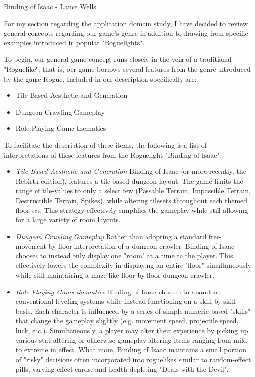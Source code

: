 \documentclass[12pt]{report}
\begin{document}
\begin{section}{Binding of Isaac - Lance Wells}

For my section regarding the application domain study, I have decided to review general concepts 
regarding our game's genre in addition to drawing from specific examples introduced in popular 
"Roguelights".

To begin, our general game concept runs closely in the vein of a traditional "Roguelike"; that is, 
our game borrows several features from the genre introduced by the game Rogue. Included in our 
description specifically are:

\begin{itemize}
\item Tile-Based Aesthetic and Generation
\item Dungeon Crawling Gameplay
\item Role-Playing Game thematics
\end{itemize}
To facilitate the description of these items, the following is a list of interpretations of these 
features from the Roguelight "Binding of Isaac".
\begin{itemize}
\item \emph{Tile-Based Aesthetic and Generation}\newline
Binding of Isaac (or more recently, the Rebirth edition), features a tile-based dungeon layout. 
The game limits the range of tile-values to only a select few (Passable Terrain, Impassible Terrain, 
Destructible Terrain, Spikes), while altering tilesets throughout each themed floor set. This strategy 
effectively simplifies the gameplay while still allowing for a large variety of room layouts.
\item	\emph{Dungeon Crawling Gameplay}\newline
Rather than adopting a standard free-movement-by-floor interpretation of a dungeon crawler. Binding 
of Isaac chooses to instead only display one "room" at a time to the player. This effectively lowers 
the complexity in displaying an entire "floor" simultaneously while still maintaining a maze-like 
floor-by-floor dungeon crawler.
\item	\emph{Role-Playing Game thematics}\newline
Binding of Isaac chooses to abandon conventional leveling systems while instead functioning on a 
skill-by-skill basis. Each character is influenced by a series of simple numeric-based "skills" that 
change the gameplay slightly (e.g. movement speed, projectile speed, luck, etc.). Simultaneously, a 
player may alter their experience by picking up various stat-altering or otherwise gameplay-altering 
items ranging from mild to extreme in effect. What more, Binding of Isaac maintains a small portion of 
"risky" decisions often incorporated into roguelikes similar to random-effect pills, varying-effect 
cards, and health-depleting "Deals with the Devil".
\end{itemize}
\end{section}
\end{document}
